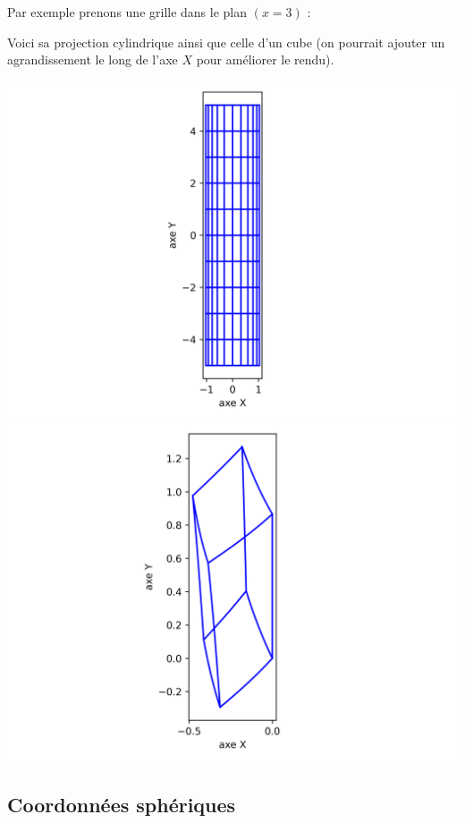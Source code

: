 \documentclass[11pt,class=report,crop=false]{standalone}
\begin{document}
Par exemple prenons une grille dans le plan $(x=3)$ :

Voici sa projection cylindrique ainsi que celle d'un cube (on pourrait ajouter un agrandissement le long de l'axe $X$ pour améliorer le rendu).
\begin{center}
	\includegraphics[scale=\myscale,scale=0.55,trim={3cm 0 3cm 0},clip]{figures/grille_coordonnees_cylindriques}	
	\includegraphics[scale=\myscale,scale=0.55,trim={3cm 0 3cm 0},clip]{figures/cube_coordonnees_cylindriques}
\end{center}

\subsection{Coordonnées sphériques}
\end{document}
